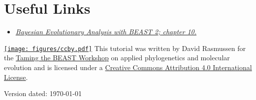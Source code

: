 \documentclass[11pt]{article}
\begin{document}
\bigskip
\section{Useful Links}

\begin{itemize}
\item \href{http://www.beast2.org/book.html}{\textit{Bayesian Evolutionary Analysis with BEAST 2; chapter 10.}}  \citep{BEAST2book2014}
\end{itemize}


\href{http://creativecommons.org/licenses/by/4.0/}{\texttt{[image: figures/ccby.pdf]}} This tutorial was written by David Rasmussen for the \href{https://www.bsse.ethz.ch/cevo/taming-the-beast.html}{Taming the BEAST Workshop} on applied phylogenetics and molecular evolution and is licensed under a \href{http://creativecommons.org/licenses/by/4.0/}{Creative Commons Attribution 4.0 International License}. 



Version dated: \today







\printbibliography[heading=relevref]
\end{document}
